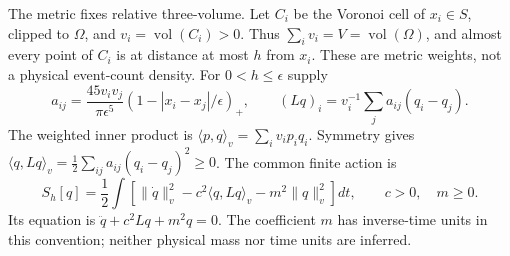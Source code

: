 The metric fixes relative three-volume. Let $C_i$ be the Voronoi cell of
$x_i\in S$, clipped to $\Omega$, and $v_i=\operatorname{vol}(C_i)>0$.
Thus $\sum_i v_i=V=\operatorname{vol}(\Omega)$, and almost every point of
$C_i$ is at distance at most $h$ from $x_i$. These are metric weights,
not a physical event-count density. For $0<h\le\epsilon$ supply
\[
 a_{ij}=\frac{45v_iv_j}{\pi\epsilon^5}
       (1-|x_i-x_j|/\epsilon)_+,
 \qquad (Lq)_i=v_i^{-1}\sum_j a_{ij}(q_i-q_j).
\]
The weighted inner product is $\langle p,q\rangle_v=\sum_i v_ip_iq_i$.
Symmetry gives
$\langle q,Lq\rangle_v=\frac12\sum_{ij}a_{ij}(q_i-q_j)^2\ge0$.
The common finite action is
\begin{equation}
 S_h[q]=\frac12\int
 \left[\|\dot q\|_v^2-c^2\langle q,Lq\rangle_v-m^2\|q\|_v^2\right]dt,
 \qquad c>0,\quad m\ge0.
 \label{eq:source-metric-scalar-action}
\end{equation}
Its equation is $\ddot q+c^2Lq+m^2q=0$. The coefficient $m$ has inverse-time
units in this convention; neither physical mass nor time units are inferred.

